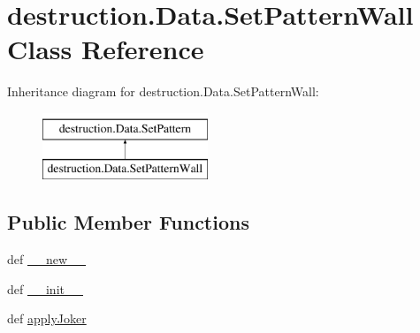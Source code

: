 \hypertarget{classdestruction_1_1_data_1_1_set_pattern_wall}{\section{destruction.\-Data.\-Set\-Pattern\-Wall Class Reference}
\label{classdestruction_1_1_data_1_1_set_pattern_wall}
}
Inheritance diagram for destruction.\-Data.\-Set\-Pattern\-Wall\-:\begin{figure}[H]
\begin{center}
\leavevmode
\includegraphics[height=2.000000cm]{classdestruction_1_1_data_1_1_set_pattern_wall}
\end{center}
\end{figure}
\subsection*{Public Member Functions}
\begin{DoxyCompactItemize}
\item 
def \hyperlink{classdestruction_1_1_data_1_1_set_pattern_wall_ac264cae4194bf140a86e22e26316fd60}{\-\_\-\-\_\-new\-\_\-\-\_\-}
\item 
def \hyperlink{classdestruction_1_1_data_1_1_set_pattern_wall_a39024f98286b47aef143942cdb85c67e}{\-\_\-\-\_\-init\-\_\-\-\_\-}
\item 
def \hyperlink{classdestruction_1_1_data_1_1_set_pattern_wall_ae0784a00f3acf136d9dd27a58ed976a2}{apply\-Joker}
\end{DoxyCompactItemize}
